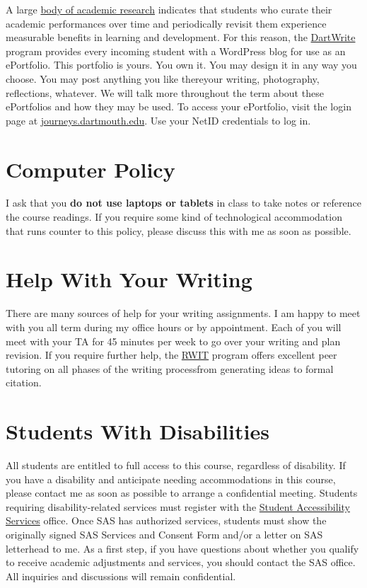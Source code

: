 \documentclass[letterpaper]{article}
\begin{document}
A large \href{http://www.opensourcewriting.org/opensourcewriting/wp-content/uploads/ePortfolios.pdf}{body of academic research} indicates that students who curate their academic performances over time and periodically revisit them experience measurable benefits in learning and development. For this reason, the \href{https://writing-speech.dartmouth.edu/dartwrite}{DartWrite} program provides every incoming student with a WordPress blog for use as an ePortfolio. This portfolio is yours. You own it. You may design it in any way you choose. You may post anything you like there\textemdash your writing, photography, reflections, whatever. We will talk more throughout the term about these ePortfolios and how they may be used. To access your ePortfolio, visit the login page at \href{https://journeys.dartmouth.edu/}{journeys.dartmouth.edu}. Use your NetID credentials to log in. 

\section*{Computer Policy}

I ask that you \textbf{do not use laptops or tablets} in class to take notes or reference the course readings. If you require some kind of technological accommodation that runs counter to this policy, please discuss this with me as soon as possible. 

 
\section*{Help With Your Writing}
There are many sources of help for your writing assignments. I am happy to meet with you all term during my office hours or by appointment. Each of you will meet with your TA for 45 minutes per week to go over your writing and plan revision. If you require further help, the \href{https://students.dartmouth.edu/rwit/}{RWIT} program offers excellent peer tutoring on all phases of the writing process\textemdash from generating ideas to formal citation.

\section*{Students With Disabilities}

All students are entitled to full access to this course, regardless of disability. If you have a disability and anticipate needing accommodations in this course, please contact me as soon as possible to arrange a confidential meeting. Students requiring disability-related services must register with the \href{http://www.dartmouth.edu/~accessibility/}{Student Accessibility Services} office. Once SAS has authorized services, students must show the originally signed SAS Services and Consent Form and/or a letter on SAS letterhead to
me. As a first step, if you have questions about whether you qualify to receive academic
adjustments and services, you should contact the SAS office. All inquiries and discussions will
remain confidential.
\end{document}
